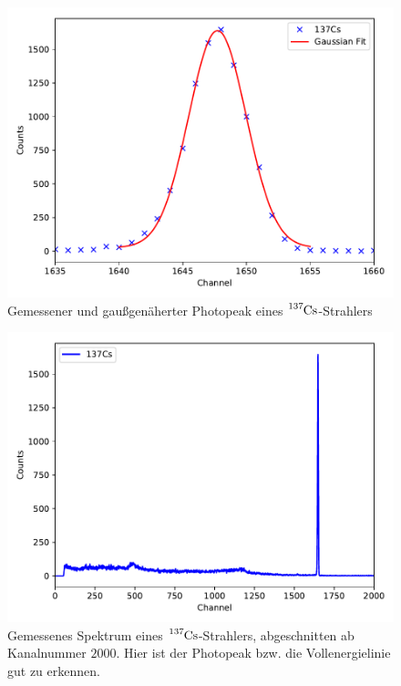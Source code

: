 \begin{figure}[H]
  \centering
  \includegraphics[scale=0.7]{content/plot22.pdf}
  \caption{Gemessener und gaußgenäherter Photopeak eines $\ce{^{137}Cs}$-Strahlers}
  \label{fig:plot22}
\end{figure}

\begin{figure}[H]
  \centering
  \includegraphics[scale=0.7]{content/plot2.pdf}
  \caption{Gemessenes Spektrum eines $\ce{^{137}Cs}$-Strahlers, abgeschnitten ab Kanalnummer $\num{2000}$. Hier ist der
  Photopeak bzw. die Vollenergielinie gut zu erkennen.}
  \label{fig:plot2}
\end{figure}



